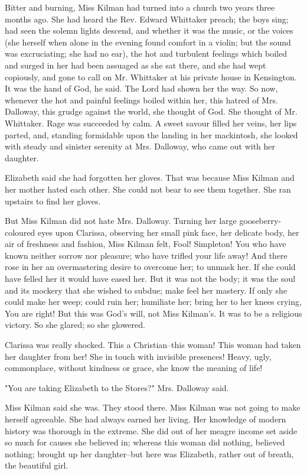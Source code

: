 \documentclass[lang=cn,10pt]{elegantbook}
\begin{document}
Bitter and burning, Miss Kilman had turned into a church two years
three months ago.  She had heard the Rev. Edward Whittaker preach;
the boys sing; had seen the solemn lights descend, and whether it
was the music, or the voices (she herself when alone in the evening
found comfort in a violin; but the sound was excruciating; she had
no ear), the hot and turbulent feelings which boiled and surged in
her had been assuaged as she sat there, and she had wept copiously,
and gone to call on Mr. Whittaker at his private house in
Kensington.  It was the hand of God, he said.  The Lord had shown
her the way.  So now, whenever the hot and painful feelings boiled
within her, this hatred of Mrs. Dalloway, this grudge against the
world, she thought of God.  She thought of Mr. Whittaker.  Rage was
succeeded by calm.  A sweet savour filled her veins, her lips
parted, and, standing formidable upon the landing in her
mackintosh, she looked with steady and sinister serenity at Mrs.
Dalloway, who came out with her daughter.

Elizabeth said she had forgotten her gloves.  That was because Miss
Kilman and her mother hated each other.  She could not bear to see
them together.  She ran upstairs to find her gloves.

But Miss Kilman did not hate Mrs. Dalloway.  Turning her large
gooseberry-coloured eyes upon Clarissa, observing her small pink
face, her delicate body, her air of freshness and fashion, Miss
Kilman felt, Fool!  Simpleton!  You who have known neither sorrow
nor pleasure; who have trifled your life away!  And there rose in
her an overmastering desire to overcome her; to unmask her.  If she
could have felled her it would have eased her.  But it was not the
body; it was the soul and its mockery that she wished to subdue;
make feel her mastery.  If only she could make her weep; could ruin
her; humiliate her; bring her to her knees crying, You are right!
But this was God's will, not Miss Kilman's.  It was to be a
religious victory.  So she glared; so she glowered.

Clarissa was really shocked.  This a Christian--this woman!  This
woman had taken her daughter from her!  She in touch with invisible
presences!  Heavy, ugly, commonplace, without kindness or grace,
she know the meaning of life!

"You are taking Elizabeth to the Stores?" Mrs. Dalloway said.

Miss Kilman said she was.  They stood there.  Miss Kilman was not
going to make herself agreeable.  She had always earned her living.
Her knowledge of modern history was thorough in the extreme.  She
did out of her meagre income set aside so much for causes she
believed in; whereas this woman did nothing, believed nothing;
brought up her daughter--but here was Elizabeth, rather out of
breath, the beautiful girl.
\end{document}
